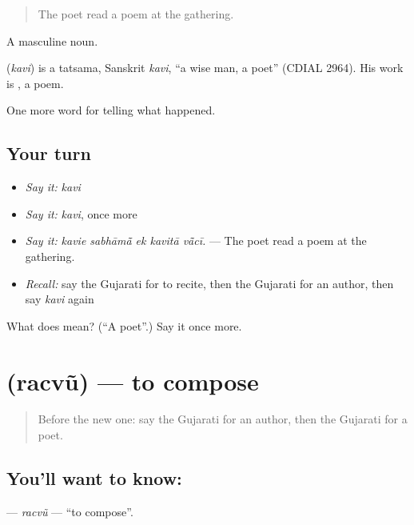 \begin{quote}
The poet read a poem at the gathering.
\end{quote}

A masculine noun.

\begin{cousinweb}
\textbf{} (\emph{kavi}) is a tatsama, Sanskrit \emph{kavi}, \textquotedblleft{}a wise man, a poet\textquotedblright{} (CDIAL 2964). His work is \textbf{}, a poem.
\end{cousinweb}

\begin{grammarlens}[title={What you've built}]
One more word for telling what happened.
\end{grammarlens}

\subsection*{Your turn}
\begin{itemize}
\raggedright
  \item \emph{Say it:} \emph{kavi}
  \item \emph{Say it:} \emph{kavi}, once more
  \item \emph{Say it:} \emph{kavie sabhāmā̃ ek kavitā vā̃cī.} — The poet read a poem at the gathering.
  \item \emph{Recall:} say the Gujarati for to recite, then the Gujarati for an author, then say \emph{kavi} again
\end{itemize}

\begin{tcolorbox}[breakable,colback=teal!4,colframe=teal!35!black,title={Before you move on}]
What does  mean? (\textquotedblleft{}A poet\textquotedblright{}.) Say it once more.
\end{tcolorbox}
\section[\texorpdfstring{\gu{રચવું} (racvũ)}{રચવું (racvũ)}]{ (racvũ) — to compose}

\label{lesson:GU-C336-racvu}



\begin{quote}
Before the new one: say the Gujarati for an author, then the Gujarati for a poet.
\end{quote}

\subsection*{You'll want to know: }
\textbf{} — \emph{racvũ} — \textquotedblleft{}to compose\textquotedblright{}.


